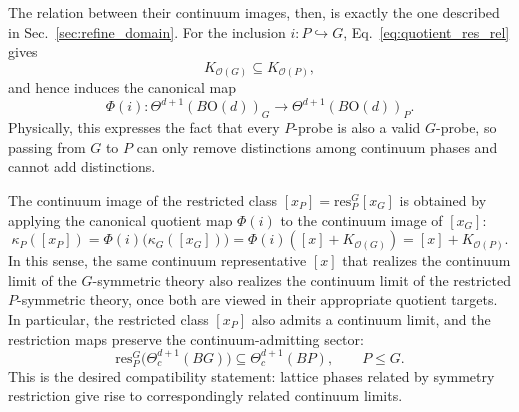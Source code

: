 \documentclass[aps,prx,reprint,superscriptaddress,twocolumn,amsmath,amssymb,amsfonts, nofootinbib]{revtex4-2}
\newcommand{\res}{\text{res}}
\theoremstyle{apsstyle}
\begin{document}
The relation between their continuum images, then, is exactly the one described in Sec.~\ref{sec:refine_domain}. For the inclusion $i:P\hookrightarrow G$, Eq.~\eqref{eq:quotient_res_rel} gives
\begin{equation*}
K_{\mathcal O(G)}\subseteq K_{\mathcal O(P)},
\end{equation*}
and hence induces the canonical map
\begin{equation*}
\Phi(i):\Theta^{d+1}(B\mathrm{O}(d))_{G}\longrightarrow \Theta^{d+1}(B\mathrm{O}(d))_{P}.
\end{equation*}
Physically, this expresses the fact that every $P$-probe is also a valid $G$-probe, so passing from $G$ to $P$ can only remove distinctions among continuum phases and cannot add distinctions. 

The continuum image of the restricted class $[x_{P}]=\res^{G}_{P}[x_{G}]$ is obtained by applying the canonical quotient map $\Phi(i)$ to the continuum image of $[x_G]$:
\begin{equation}
\kappa_P([x_P])=\Phi(i)\bigl(\kappa_G([x_G])\bigr)
=\Phi(i)\left([x]+ K_{\mathcal{O}(G)}\right)
=[x]+ K_{\mathcal{O}(P)}.
\label{eq:continuum_inclusion_compatibility}
\end{equation}
In this sense, the same continuum representative $[x]$ that realizes the continuum limit of the $G$-symmetric theory also realizes the continuum limit of the restricted $P$-symmetric theory, once both are viewed in their appropriate quotient targets. In particular, the restricted class $[x_{P}]$ also admits a continuum limit, and the restriction maps preserve the continuum-admitting sector:
\begin{equation}
    \res^G_P\bigl(\Theta^{d+1}_{c}(BG)\bigr)\subseteq \Theta^{d+1}_{c}(BP),
    \qquad P\le G.
    \label{eq:restriction_closure}
\end{equation}
This is the desired compatibility statement: lattice phases related by symmetry restriction give rise to correspondingly related continuum limits.

\bigskip 
\end{document}
